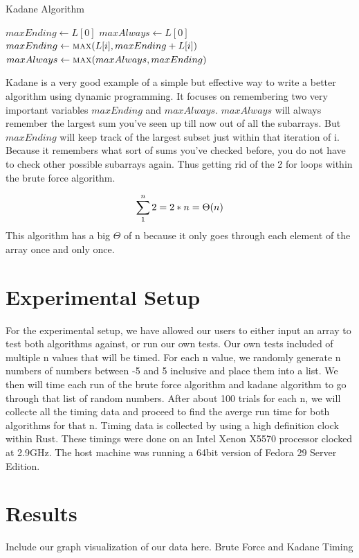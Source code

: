 \documentclass[10pt, letterpaper]{article}
\begin{document}
  \begin{algorithm}
		\caption{Kadane Algorithm}\label{kadane}
	\begin{algorithmic}
    \State $maxEnding \gets L[0]$
    \State $maxAlways \gets L[0]$
    \State $maxEnding \gets \Call{max}{L[i], maxEnding + L[i]}$
    \State $maxAlways \gets \Call{max}{maxAlways, maxEnding}$
    \EndFor
	  \EndFunction
	\end{algorithmic}
	\end{algorithm}
  Kadane is a very good example of a simple but effective way to write a better algorithm using dynamic programming. It focuses on remembering two very important variables $maxEnding$ and $maxAlways$. $maxAlways$ will always remember the largest sum you've seen up till now out of all the subarrays. But $maxEnding$ will keep track of the largest subset just within that iteration of i. Because it remembers what sort of sums you've checked before, you do not have to check other possible subarrays again. Thus getting rid of the 2 for loops within the brute force algorithm.

  \[
  \sum_1^n2 \\
  = 2 * n \\
  = \Theta(n)
		\]
	This algorithm has a big $\Theta$ of n because it only goes through each element of the array once and only once.
	\section{Experimental Setup}
	For the experimental setup, we have allowed our users to either input an array to test both algorithms against, or run our own tests.
  Our own tests included of multiple n values that will be timed. For each n value, we randomly generate n numbers of numbers between -5 and 5 inclusive and place them into a list. We then will time each run of the brute force algorithm and kadane algorithm to go through that list of random numbers. After about 100 trials for each n, we will collecte all the timing data and proceed to find the averge run time for both algorithms for that n.
  Timing data is collected by using a high definition clock within Rust. These timings were done on an Intel Xenon X5570 processor clocked at 2.9GHz. The host machine was running a 64bit version of Fedora 29 Server Edition.
	\section{Results}
	Include our graph visualization of our data here. Brute Force and Kadane Timing
\end{document}
